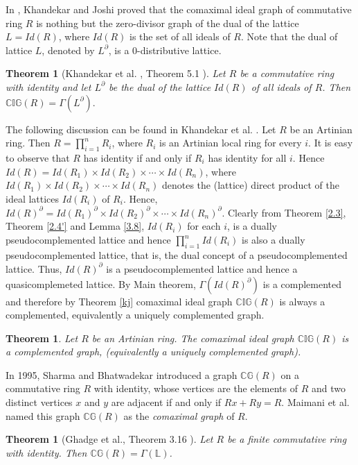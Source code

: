 \documentclass[10pt,one side,emlines]{amsart}
\newtheorem{thm}[lem]{Theorem}
\theoremstyle{definition}
\begin{document}
In \cite{KJ}, Khandekar and Joshi proved that the comaximal ideal graph of commutative ring $R$ is nothing but the zero-divisor graph of the dual of the lattice $L=Id(R)$, where $Id(R)$ is the set of all ideals of $R$. Note that the dual of lattice $L$, denoted by $L^\partial$, is a $0$-distributive lattice.

\begin{thm}[Khandekar et al. \cite{KJ}, Theorem 5.1 \label{kj}] Let $R$ be a commutative ring with identity and let $L^\partial$ be the dual of the lattice $Id(R)$ of all ideals of $R$. Then $\mathbb{CIG}(R) = \Gamma(L^\partial).$
\end{thm}

The following discussion can be found in Khandekar et al. \cite{KJ}. 
Let $R$ be an Artinian ring. Then $R =\displaystyle \prod_{i=1}^{n}{R_i}$, where $R_i$
is an Artinian local ring for every $i$. It is easy to observe that $R$ has identity if and only if $R_i$ has identity for all $i$. Hence $Id(R) = Id(R_1) \times Id(R_2) \times \cdots \times Id(R_n)$, where
$Id(R_1) \times Id(R_2) \times \cdots \times Id(R_n)$ denotes the (lattice) direct product of the ideal lattices $Id(R_i)$ of $R_i$.
Hence, $Id(R)^\partial = Id(R_1)^\partial \times Id(R_2)^\partial \times \cdots \times  Id(R_n)^\partial$. Clearly from Theorem \ref{2.3}, Theorem \ref{2.4'} and Lemma \ref{3.8}, $Id(R_i)$ for each $i$, is a dually pseudocomplemented lattice and hence $\displaystyle \prod_{i=1}^{n}{Id(R_i)}$ is also a dually pseudocomplemented lattice, that is, the dual concept of a pseudocomplemented lattice. Thus, $Id(R)^\partial$ is a pseudocomplemented lattice and hence a quasicomplemeted lattice. By Main theorem, $\Gamma(Id(R)^\partial)$ is a complemented and therefore by Theorem \ref{kj} comaximal ideal graph $\mathbb{CIG}(R)$ is always a complemented, equivalently a uniquely complemented graph. 

\begin{thm} Let $R$ be an Artinian ring. The comaximal ideal graph $\mathbb{CIG}(R)$ is a complemented graph, (equivalently a uniquely complemented graph).  
\end{thm}


In 1995, Sharma and Bhatwadekar \cite{SB} introduced a graph
$\mathbb{CG}(R)$ on a commutative ring $R$ with identity, whose vertices are
the elements of $R$ and two distinct vertices $x$ and $y$ are adjacent
if and only if $Rx + Ry = R$.
Maimani et al. \cite{MSSY}	named this graph $\mathbb{CG}(R)$ as the \textit{comaximal graph} of $R$.
\begin{thm}[Ghadge et al.\cite{GKJ}, Theorem 3.16 \label{pg}]
	Let $R$ be a finite commutative ring with identity.	Then $\mathbb{CG}(R)=\Gamma(\mathbb{L})$.  
\end{thm}
\end{document}
